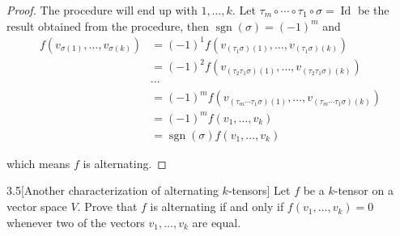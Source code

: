 \begin{proof}
    The procedure will end up with \( 1, \ldots, k \). Let \( \tau_{m} \circ \cdots \circ \tau_{1} \circ \sigma = \operatorname{Id} \) be the result obtained from the procedure, then \( \operatorname{sgn}(\sigma) = {(-1)}^{m} \) and
    \begingroup
    \allowdisplaybreaks%
    \begin{align*}
        f(v_{\sigma(1)}, \ldots, v_{\sigma(k)}) & = {(-1)}^{1} f(v_{(\tau_{1}\sigma)(1)}, \ldots, v_{(\tau_{1}\sigma)(k)})                             \\
                                                & = {(-1)}^{2} f(v_{(\tau_{2}\tau_{1}\sigma)(1)}, \ldots, v_{(\tau_{2}\tau_{1}\sigma)(k)})             \\
                                                & \cdots                                                                                               \\
                                                & = {(-1)}^{m} f(v_{(\tau_{m}\cdots\tau_{1}\sigma)(1)}, \ldots, v_{(\tau_{m}\cdots\tau_{1}\sigma)(k)}) \\
                                                & = {(-1)}^{m} f(v_{1}, \ldots, v_{k})                                                                 \\
                                                & = \operatorname{sgn}(\sigma) f(v_{1}, \ldots, v_{k})
    \end{align*}
    \endgroup

    which means \( f \) is alternating.
\end{proof}

\begin{problem}{3.5}[Another characterization of alternating \( k \)-tensors]
Let \( f \) be a \( k \)-tensor on a vector space \( V \). Prove that \( f \) is alternating if and only if \( f(v_{1}, \ldots, v_{k}) = 0 \) whenever two of the vectors \( v_{1}, \ldots, v_{k} \) are equal.
\end{problem}


